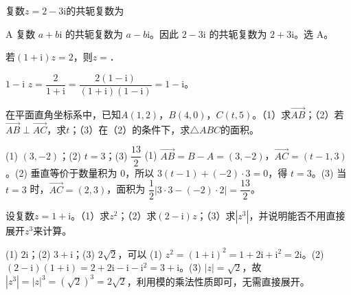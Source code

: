 

\begin{question}[GPT生成]
复数$z=2-3\text{i}$的共轭复数为\choiceBox
{}
\end{question}
\begin{answer}{A}
复数 $a+b\text{i}$ 的共轭复数为 $a-b\text{i}$。因此 $2-3\text{i}$ 的共轭复数为 $2+3\text{i}$。选 A。
\end{answer}

\begin{question}[GPT生成]
若$(1+\text{i})z=2$，则$z=$\blank{3cm}．
\end{question}
\begin{answer}{$1-\text{i}$}
$z=\dfrac{2}{1+\text{i}}=\dfrac{2(1-\text{i})}{(1+\text{i})(1-\text{i})}=1-\text{i}$。
\end{answer}



\begin{question}[GPT生成]
在平面直角坐标系中，已知$A(1,2)$，$B(4,0)$，$C(t,5)$。（1）求$\overrightarrow{AB}$；（2）若$\overrightarrow{AB}\perp\overrightarrow{AC}$，求$t$；（3）在（2）的条件下，求$\triangle ABC$的面积。
\end{question}
\solutionSpace{5cm}
\begin{answer}{(1) $(3,-2)$；(2) $t=3$；(3) $\dfrac{13}{2}$}
(1) $\overrightarrow{AB}=B-A=(3,-2)$，$\overrightarrow{AC}=(t-1,3)$。(2) 垂直等价于数量积为 $0$，所以 $3(t-1)+(-2)\cdot3=0$，得 $t=3$。(3) 当 $t=3$ 时，$\overrightarrow{AC}=(2,3)$，面积为 $\dfrac12|3\cdot3-(-2)\cdot2|=\dfrac{13}{2}$。
\end{answer}

\begin{question}[GPT生成]
设复数$z=1+\text{i}$。（1）求$z^2$；（2）求$(2-\text{i})z$；（3）求$|z^3|$，并说明能否不用直接展开$z^3$来计算。
\end{question}
\solutionSpace{5cm}
\begin{answer}{(1) $2\text{i}$；(2) $3+\text{i}$；(3) $2\sqrt2$，可以}
(1) $z^2=(1+\text{i})^2=1+2\text{i}+\text{i}^2=2\text{i}$。(2) $(2-\text{i})(1+\text{i})=2+2\text{i}-\text{i}-\text{i}^2=3+\text{i}$。(3) $|z|=\sqrt2$，故 $|z^3|=|z|^3=(\sqrt2)^3=2\sqrt2$，利用模的乘法性质即可，无需直接展开。
\end{answer}

\printChapterAnswers

